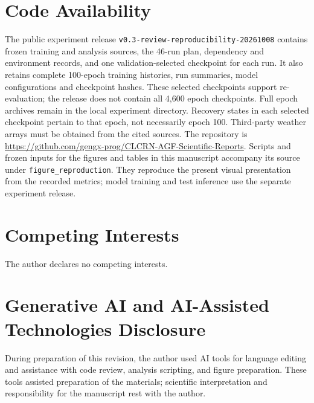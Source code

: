 \documentclass[fleqn,10pt]{wlscirep}
\begin{document}
\section{Code Availability}
The public experiment release \texttt{v0.3-review-reproducibility-20261008} contains
frozen training and analysis sources, the 46-run plan, dependency and
environment records, and one validation-selected checkpoint for each run.
It also retains complete 100-epoch training histories, run summaries,
model configurations and checkpoint hashes. These selected checkpoints
support re-evaluation; the release does not contain all 4,600 epoch
checkpoints. Full epoch archives remain in the local experiment directory.
Recovery states in each selected checkpoint pertain to that epoch, not
necessarily epoch 100. Third-party weather arrays must be obtained from
the cited sources.
The repository is
\url{https://github.com/gengx-prog/CLCRN-AGF-Scientific-Reports}.
Scripts and frozen inputs for the figures and tables in this manuscript
accompany its source under \texttt{figure\_reproduction}. They reproduce
the present visual presentation from the recorded metrics; model training
and test inference use the separate experiment release.

\section{Competing Interests}
The author declares no competing interests.

\section{Generative AI and AI-Assisted Technologies Disclosure}
During preparation of this revision, the author used AI tools for language
editing and assistance with code review, analysis scripting, and figure
preparation. These tools assisted preparation of the materials; scientific interpretation and responsibility for the manuscript rest with the author.
\end{document}
